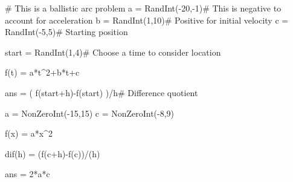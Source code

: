 \begin{sagesilent}
# This is a ballistic arc problem
a = RandInt(-20,-1)# This is negative to account for acceleration
b = RandInt(1,10)# Positive for initial velocity
c = RandInt(-5,5)# Starting position

start = RandInt(1,4)# Choose a time to consider location

f(t) = a*t^2+b*t+c

ans = ( f(start+h)-f(start) )/h# Difference quotient

\end{sagesilent}


\begin{sagesilent}
a = NonZeroInt(-15,15)
c = NonZeroInt(-8,9)

f(x) = a*x^2

dif(h) = (f(c+h)-f(c))/(h)

ans = 2*a*c

\end{sagesilent}

%




%
%
%
%
%
%
%
%
%
%
%
%
%
%
%
%
%
%
%
%
%


